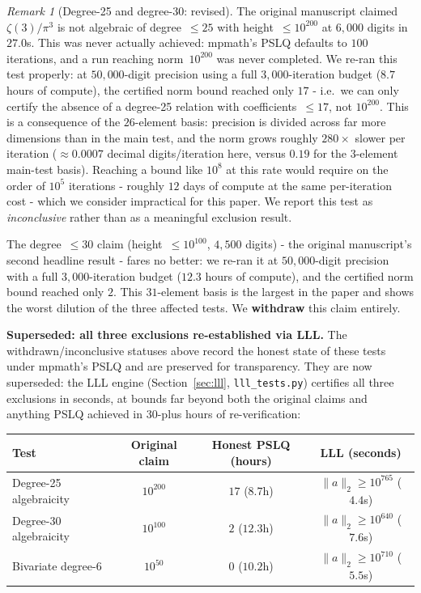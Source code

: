 \documentclass[12pt]{article}
\theoremstyle{definition}
\theoremstyle{remark}
\newtheorem{remark}[theorem]{Remark}
\begin{document}
\begin{remark}[Degree-25 and degree-30: revised]\label{res:deg25-revised}
The original manuscript claimed $\zeta(3)/\pi^3$ is not algebraic of
degree~$\le 25$ with height~$\le 10^{200}$ at $6{,}000$ digits in
$27.0$s.  This was never actually achieved: mpmath's PSLQ defaults to
$100$ iterations, and a run reaching norm~$10^{200}$ was never
completed.  We re-ran this test properly: at $50{,}000$-digit
precision using a full $3{,}000$-iteration budget ($8.7$ hours of
compute), the certified norm bound reached only $17$ - i.e.\ we can
only certify the absence of a degree-25 relation with
coefficients~$\le 17$, not $10^{200}$.  This is a consequence of the
$26$-element basis: precision is divided across far more dimensions
than in the main test, and the norm grows roughly $280\times$ slower
per iteration ($\approx 0.0007$ decimal digits/iteration here, versus
$0.19$ for the $3$-element main-test basis).  Reaching a bound like
$10^8$ at this rate would require on the order of $10^5$ iterations -
roughly $12$ days of compute at the same per-iteration cost - which we
consider impractical for this paper.  We report this test as
\emph{inconclusive} rather than as a meaningful exclusion result.

The degree~$\le 30$ claim (height~$\le 10^{100}$, $4{,}500$ digits) -
the original manuscript's second headline result - fares no better:
we re-ran it at $50{,}000$-digit precision with a full
$3{,}000$-iteration budget ($12.3$ hours of compute), and the
certified norm bound reached only $2$.  This $31$-element basis is the
largest in the paper and shows the worst dilution of the three
affected tests.  We \textbf{withdraw} this claim entirely.

\textbf{Superseded: all three exclusions re-established via LLL.}
The withdrawn/inconclusive statuses above record the honest state of
these tests under mpmath's PSLQ and are preserved for transparency.
They are now superseded: the LLL engine (Section~\ref{sec:lll},
\texttt{lll\_tests.py}) certifies all three exclusions in seconds, at
bounds far beyond both the original claims and anything PSLQ achieved
in 30-plus hours of re-verification:

\begin{center}
\begin{tabular}{@{}lccc@{}}
\toprule
Test & Original claim & Honest PSLQ (hours) & LLL (seconds) \\
\midrule
Degree-25 algebraicity & $10^{200}$ & $17$ ($8.7$h) & $\|a\|_2\ge 10^{765}$ ($4.4$s) \\
Degree-30 algebraicity & $10^{100}$ & $2$ ($12.3$h) & $\|a\|_2\ge 10^{640}$ ($7.6$s) \\
Bivariate degree-6 & $10^{50}$ & $0$ ($10.2$h) & $\|a\|_2\ge 10^{710}$ ($5.5$s) \\
\bottomrule
\end{tabular}
\end{center}


\end{remark}
\end{document}
